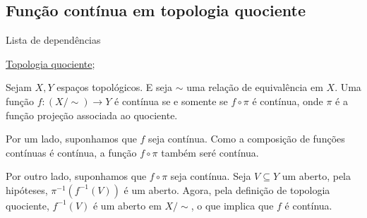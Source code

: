 \subsection{Função contínua em topologia quociente}
\label{funcao-continua-em-topologia-quociente-prop}
\begin{titlemize}{Lista de dependências}
	\item \hyperref[topologia-quociente-def]{Topologia quociente}; 
\end{titlemize}

\begin{prop}
    Sejam $X,Y$ espaços topológicos. E seja $\sim$ uma relação de equivalência em $X$. Uma função $f:(X/\sim) \longrightarrow Y$ é contínua se e somente se $f\circ \pi$ é contínua, onde $\pi$ é a função projeção associada ao quociente.
\end{prop}
\begin{dem}
    Por um lado, suponhamos que $f$ seja contínua. Como a composição de funções contínuas é contínua, a função $f\circ \pi$ também seré contínua.

    Por outro lado, suponhamos que $f\circ \pi$ seja contínua. Seja $V\subseteq Y$ um aberto, pela hipóteses, $\pi^{-1}(f^{-1}(V))$ é um aberto. Agora, pela definição de topologia quociente, $f^{-1}(V)$ é um aberto em $X/\sim$, o que implica que $f$ é contínua. 
\end{dem}
